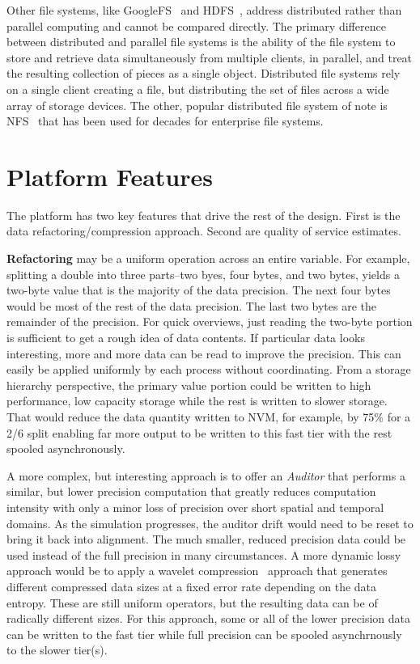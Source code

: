\documentclass[letterpaper,twocolumn,10pt]{article}
\begin{document}
Other file systems, like GoogleFS~\cite{ghemawat:googlefs} and
HDFS~\cite{Shvachko:2010:hdfs}, address distributed rather than parallel
computing and cannot be compared directly.
The primary difference between
distributed and parallel file systems is the ability of the file system to
store and retrieve data simultaneously from multiple clients, in parallel, and
treat the resulting collection of pieces as a single object.  Distributed file
systems rely on a single client creating a file, but distributing the set of
files across a wide array of storage devices.
The other, popular distributed
file system of note is NFS~\cite{powlowski:1994:nfs3} that has been used for
decades for enterprise file systems.

\section{Platform Features}
\label{sec:features}

The platform has two key features that drive the rest of the design. First is
the data refactoring/compression approach. Second are quality of service
estimates. 

\noindent\textbf{Refactoring} may be a uniform operation across an
entire variable. For example, splitting a double into three parts--two byes,
four bytes, and two bytes, yields a two-byte value that is the majority of the
data precision. The next four bytes would be most of the rest of the data
precision. The last two bytes are the remainder of the precision. For quick
overviews, just reading the two-byte portion is sufficient to get a rough idea
of data contents. If particular data looks interesting, more and more data can
be read to improve the precision. This can easily be applied uniformly by each
process without coordinating. From a storage hierarchy perspective, the primary
value portion could be written to high performance, low capacity storage while
the rest is written to slower storage. That would reduce the data quantity
written to NVM, for example, by 75\% for a 2/6 split enabling far more output
to be written to this fast tier with the rest spooled asynchronously.

A more complex, but interesting approach is to offer an {\em Auditor} that
performs a similar, but lower precision computation that greatly reduces
computation intensity with only a minor loss of precision over short spatial
and temporal domains. As the simulation progresses, the auditor drift would
need to be reset to bring it back into alignment. The much smaller, reduced
precision data could be used instead of the full precision in many
circumstances.  A more dynamic lossy approach would be to apply a wavelet
compression~\cite{klappenecker:1995:wavelet} approach that generates different
compressed data sizes at a fixed error rate depending on the data entropy.
These are still uniform operators, but the resulting data can be of radically
different sizes. For this approach, some or all of the lower precision data
can be written to the fast tier while full precision can be spooled
asynchrnously to the slower tier(s).
\end{document}
